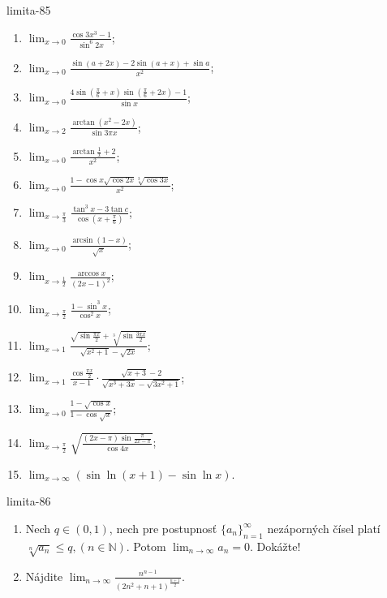 \begin{defproblem}{limita-85}
\begin{multicols}{2}
\begin{enumerate}
    \item $\lim_{x \rightarrow 0} \frac{\cos 3x^3-1}{\sin ^6 2x}$;
    \item $\lim_{x \rightarrow 0} \frac{\sin (a+2x)-2\sin (a+x)+\sin a}{x^2}$;
    \item $\lim_{x \rightarrow 0} \frac{4\sin (\frac{\pi}{6}+x)\sin (\frac{\pi}{6}+2x)-1}{\sin x}$;
    
    \item $\lim_{x \rightarrow 2} \frac{\arctan (x^2-2x)}{\sin 3\pi x}$;
    \item $\lim_{x \rightarrow 0} \frac{\arctan \frac{1}{x}+2}{x^2}$;
    \item $\lim_{x \rightarrow 0} \frac{1-\cos x\sqrt{\cos 2x}\sqrt[3]{\cos 3x}}{x^2}$;
    \item $\lim_{x \rightarrow \frac{\pi}{3}} \frac{\tan^3 x-3 \tan c}{\cos (x+\frac{\pi}{6})}$;
    \item $\lim_{x \rightarrow 0} \frac{\arcsin (1-x)}{\sqrt{x}}$;
    \item $\lim_{x \rightarrow \frac{1}{2}} \frac{\arccos x}{(2x-1)^2}$;
    \item $\lim_{x \rightarrow \frac{\pi}{2}} \frac{1-\sin ^3 x}{\cos ^2 x}$;
    \item $\lim_{x \rightarrow 1} \frac{\sqrt{\sin \frac{\pi x}{2}}+\sqrt[3]{\sin \frac{3\pi x}{2}}}{\sqrt{x^2+1}-\sqrt{2x}}$;
    \item $\lim_{x \rightarrow 1} \frac{\cos \frac{\pi x}{2}}{x-1}\cdot \frac{\sqrt{x+3}-2}{\sqrt{x^3+3x}-\sqrt{3x^2+1}}$;
    \item $\lim_{x \rightarrow 0} \frac{1-\sqrt{\cos x}}{1-\cos \sqrt{x}}$;
    \item $\lim_{x \rightarrow \frac{\pi}{2}} \sqrt{\frac{(2x-\pi)\sin \frac{\pi}{2x-\pi}}{\cos 4x}}$;
    \item $\lim_{x \rightarrow \infty} (\sin \ln (x+1)-\sin \ln x)$.
\end{enumerate}
\end{multicols}
\end{defproblem}

\begin{defproblem}{limita-86}
\begin{enumerate}
\item Nech $q \in (0,1)$, nech pre postupnosť ${\{a_n\}}_{n=1}^\infty$ nezáporných čísel platí $\sqrt[n]{a_n}\leq q,(n \in \mathbb{N})$. Potom $\lim_{n \rightarrow \infty} a_n=0$. Dokážte!
\item Nájdite $\lim_{n \rightarrow \infty}\frac{n^{n-1}}{(2n^2+n+1)^{\frac{n+1}{2}}}$.
\end{enumerate}
\end{defproblem}

